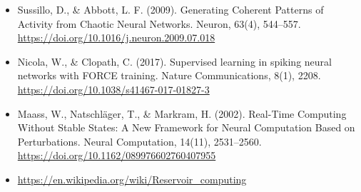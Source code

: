 \documentclass[12pt, a4paper]{article}
\begin{document}
\begin{itemize}
    \item Sussillo, D., \& Abbott, L. F. (2009). Generating Coherent Patterns of Activity from Chaotic Neural Networks. Neuron, 63(4), 544–557. \url{https://doi.org/10.1016/j.neuron.2009.07.018}
    \item Nicola, W., \& Clopath, C. (2017). Supervised learning in spiking neural networks with FORCE training. Nature Communications, 8(1), 2208. \url{https://doi.org/10.1038/s41467-017-01827-3}
    \item Maass, W., Natschläger, T., \& Markram, H. (2002). Real-Time Computing Without Stable States: A New Framework for Neural Computation Based on Perturbations. Neural Computation, 14(11), 2531–2560. \url{https://doi.org/10.1162/089976602760407955}
    \item \url{https://en.wikipedia.org/wiki/Reservoir_computing}
\end{itemize}

\newpage
\end{document}
